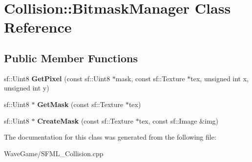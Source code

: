 \hypertarget{class_collision_1_1_bitmask_manager}{}\section{Collision\+:\+:Bitmask\+Manager Class Reference}
\label{class_collision_1_1_bitmask_manager}
\subsection*{Public Member Functions}
\begin{DoxyCompactItemize}
\item 
\mbox{\label{class_collision_1_1_bitmask_manager_ae0bf2e9cc81ae50c0da7d383acb264b6}} 
sf\+::\+Uint8 {\bfseries Get\+Pixel} (const sf\+::\+Uint8 $\ast$mask, const sf\+::\+Texture $\ast$tex, unsigned int x, unsigned int y)
\item 
\mbox{\label{class_collision_1_1_bitmask_manager_a6da15023c27785497cee1460dd9f8414}} 
sf\+::\+Uint8 $\ast$ {\bfseries Get\+Mask} (const sf\+::\+Texture $\ast$tex)
\item 
\mbox{\label{class_collision_1_1_bitmask_manager_ab7e2582599c79d8a4e8d603515ed95f8}} 
sf\+::\+Uint8 $\ast$ {\bfseries Create\+Mask} (const sf\+::\+Texture $\ast$tex, const sf\+::\+Image \&img)
\end{DoxyCompactItemize}


The documentation for this class was generated from the following file\+:\begin{DoxyCompactItemize}
\item 
Wave\+Game/S\+F\+M\+L\+\_\+\+Collision.\+cpp\end{DoxyCompactItemize}
